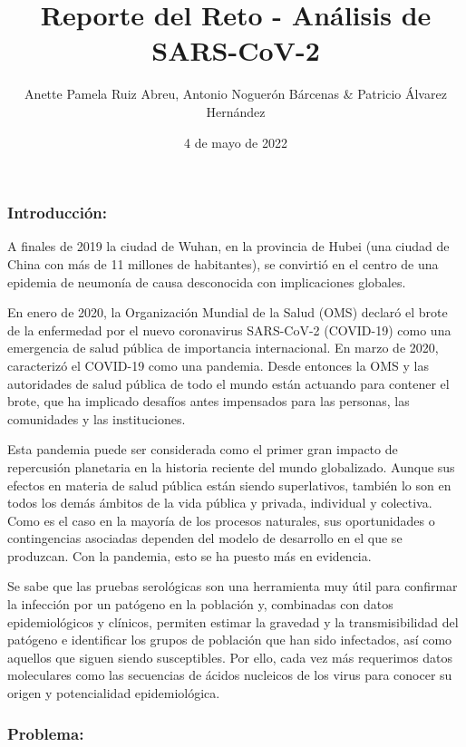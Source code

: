 \documentclass[
  12pt,
]{article}
\title{Reporte del Reto - Análisis de SARS-CoV-2}
\author{Anette Pamela Ruiz Abreu, Antonio Noguerón Bárcenas \& Patricio
Álvarez Hernández}
\date{4 de mayo de 2022}
\begin{document}
\maketitle

\hypertarget{introducciuxf3n}{%
\subsubsection{Introducción:}\label{introducciuxf3n}}

A finales de 2019 la ciudad de Wuhan, en la provincia de Hubei (una
ciudad de China con más de 11 millones de habitantes), se convirtió en
el centro de una epidemia de neumonía de causa desconocida con
implicaciones globales.

En enero de 2020, la Organización Mundial de la Salud (OMS) declaró el
brote de la enfermedad por el nuevo coronavirus SARS-CoV-2 (COVID-19)
como una emergencia de salud pública de importancia internacional. En
marzo de 2020, caracterizó el COVID-19 como una pandemia. Desde entonces
la OMS y las autoridades de salud pública de todo el mundo están
actuando para contener el brote, que ha implicado desafíos antes
impensados para las personas, las comunidades y las instituciones.

Esta pandemia puede ser considerada como el primer gran impacto de
repercusión planetaria en la historia reciente del mundo globalizado.
Aunque sus efectos en materia de salud pública están siendo
superlativos, también lo son en todos los demás ámbitos de la vida
pública y privada, individual y colectiva. Como es el caso en la mayoría
de los procesos naturales, sus oportunidades o contingencias asociadas
dependen del modelo de desarrollo en el que se produzcan. Con la
pandemia, esto se ha puesto más en evidencia.

Se sabe que las pruebas serológicas son una herramienta muy útil para
confirmar la infección por un patógeno en la población y, combinadas con
datos epidemiológicos y clínicos, permiten estimar la gravedad y la
transmisibilidad del patógeno e identificar los grupos de población que
han sido infectados, así como aquellos que siguen siendo susceptibles.
Por ello, cada vez más requerimos datos moleculares como las secuencias
de ácidos nucleicos de los virus para conocer su origen y potencialidad
epidemiológica.

\hypertarget{problema}{%
\subsubsection{Problema:}\label{problema}}
\end{document}

